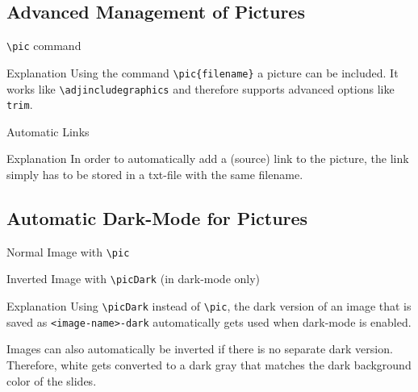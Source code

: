 \documentclass[
	aspectratio=169, %
	8pt, %
]{beamer}
\begin{document}
\subsection{Advanced Management of Pictures}
\begin{frame}{\insertsubsection}
	\begin{fancycolumns}[t]
		\begin{example}{\texttt{\textbackslash pic} command}
			\centering{}
		\end{example}
		\begin{info}{Explanation}
			Using the command \texttt{\textbackslash pic\{filename\}} a picture can be included. It works like \texttt{\textbackslash adjincludegraphics} and therefore supports advanced options like \texttt{trim}.
		\end{info}
	\nextcolumn
		\begin{example}{Automatic Links}
			\centering{} %
		\end{example}
		\begin{info}{Explanation}
			In order to automatically add a (source) link to the picture, the link simply has to be stored in a txt-file with the same filename.
		\end{info}
	\end{fancycolumns}
\end{frame}

\subsection{Automatic Dark-Mode for Pictures}
\begin{frame}{\insertsubsection}
	\begin{fancycolumns}
		\begin{infotight}{Normal Image with \texttt{\textbackslash pic}}
			\centering
		\end{infotight}
	\nextcolumn
		\begin{infotight}{Inverted Image with \texttt{\textbackslash picDark} (in dark-mode only)}
			\centering
		\end{infotight}
	\end{fancycolumns}
	\begin{info}{Explanation}
		Using \texttt{\textbackslash picDark} instead of \texttt{\textbackslash pic}, the dark version of an image that is saved as \texttt{<image-name>-dark} automatically gets used when dark-mode is enabled.

		Images can also automatically be inverted if there is no separate dark version. Therefore, white gets converted to a dark gray that matches the dark background color of the slides.
	\end{info}
\end{frame}
\end{document}
